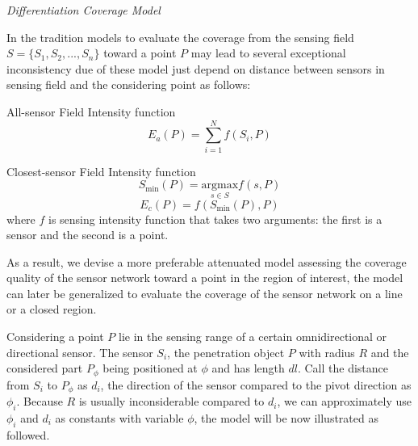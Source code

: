 \begin{df}
	{\itshape Differentiation Coverage Model}
\end{df}
In the tradition models to evaluate the coverage from the sensing field $S=\{S_1, S_2,..., S_n\}$ toward a point $P$ may lead to several exceptional inconsistency due of these model just depend on distance between sensors in sensing field and the considering point \cite{megerian2002exposure} as follows:\par
All-sensor Field Intensity function
\begin{equation}
\label{equa:01}
E_a(P) = \sum\limits_{i = 1}^N {f({S_i},P)} 
\end{equation}

Closest-sensor Field Intensity function
\begin{equation}
\label{equa:02}
S_{\text{min}}(P) = \underset{s \in S}{\text{argmax}}f(s, P)
\end{equation}
\begin{equation}
\label{equa:03}
E_c(P) = f({S_{\min}(P)},P)
\end{equation}
where $f$ is sensing intensity function that takes two arguments: the first is a sensor and the second is a point.

As a result, we devise a more preferable attenuated model assessing the coverage quality of the sensor network toward a point in the region of interest, the model can later be generalized to evaluate the coverage of the sensor network on a line or a closed region.

Considering a point $P$ lie in the sensing range of a certain omnidirectional or directional sensor. The sensor $S_i$, the penetration object $P$ with radius $R$ and the considered part $P_\phi$ being positioned at $\phi$ and has length $dl$. Call the distance from $S_i$ to $P_\phi$ as $d_i$, the direction of the sensor compared to the pivot direction as $\phi_i$. Because $R$ is usually inconsiderable compared to $d_i$, we can approximately use $\phi_i$ and $d_i$ as constants with variable $\phi$, the model will be now illustrated as followed.

